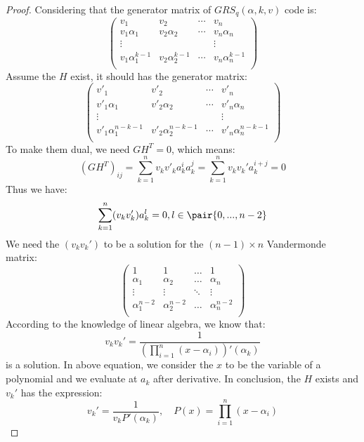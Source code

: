 \begin{proof}
Considering that the generator matrix of \( GRS_q( \alpha, k, v ) \) code is:
\[
    \begin{pmatrix}
        v_1 & v_2 & \cdots & v_n \\
        v_1 \alpha_1 & v_2 \alpha_2 & \cdots & v_n \alpha_n \\
        \vdots & & & \vdots \\
        v_1 \alpha_1^{ k - 1 } & v_2 \alpha_2^{ k - 1 } & \cdots & v_n \alpha_n^{ k - 1 } \\
    \end{pmatrix}
\]
Assume the \( H \) exist, it should has the generator matrix:
\[
    \begin{pmatrix}
        v'_1 & v'_2 & \cdots & v'_n \\
        v'_1 \alpha_1 & v'_2 \alpha_2 & \cdots & v'_n \alpha_n \\
        \vdots & & & \vdots \\
        v'_1 \alpha_1^{ n - k - 1 } & v'_2 \alpha_2^{ n - k - 1 } & \cdots & v'_n \alpha_n^{ n - k - 1 } \\
    \end{pmatrix}
\]
To make them dual, we need \( GH^T = 0 \), which means:
\[
    ( GH^T )_{ ij } = \sum_{ k = 1 }^n v_k v'_k a_k^{ i } a_k^{ j } = \sum_{ k = 1 }^n v_k v_k' a_k^{ i + j } = 0
\]
Thus we have:
\[
    \sum_{ k = 1 }^n ( v_k v_k' ) a_k^{ l } = 0, l \in \pair{ 0, ..., n - 2 }
\]
We need the \( ( v_k v_k' ) \) to be a solution for the \( ( n - 1 ) \times n \) Vandermonde matrix:
\[
    \begin{pmatrix}
    1 & 1 & \dots & 1 \\
    \alpha_1 & \alpha_2 & \dots & \alpha_n \\
    \vdots & \vdots & \ddots & \vdots \\ 
    \alpha_1^{n-2} & \alpha_2^{n-2} & \dots & \alpha_n^{n-2} \\
    \end{pmatrix}
\]
According to the knowledge of linear algebra, we know that:
\[
    v_k v_k' = \frac{ 1 }{ \left( \prod_{ i = 1 }^n ( x - \alpha_i ) \right)'( \alpha_k ) }
\]
is a solution. In above equation, we consider the \( x \) to be the variable of a polynomial and we evaluate at \( a_k \) after derivative. In conclusion, the \( H \) exists and \( v_k' \) has the expression:
\[
    v_k' = \frac{ 1 }{ v_k P'( \alpha_k ) },
    \quad 
    P(x) = \prod_{ i = 1 }^n ( x - \alpha_i )
\]



\end{proof}


